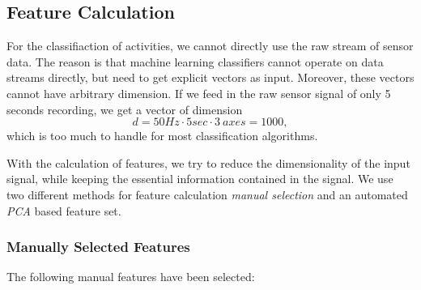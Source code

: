 \subsection{Feature Calculation}
\label{sec:feature_calc}

For the classifiaction of activities, we cannot directly use the raw
stream of sensor data. The reason is that machine learning classifiers
cannot operate on data streams directly, but need to get explicit
vectors as input. Moreover, these vectors cannot have arbitrary
dimension. If we feed in the raw sensor signal of only 5 seconds
recording, we get a vector of dimension
\[ d = 50 Hz \cdot 5 sec \cdot 3\ axes = 1000, \]
which is too much to handle for most classification algorithms.

With the calculation of features, we try to reduce the dimensionality
of the input signal, while keeping the essential information contained
in the signal. We use two different methods for feature calculation
{\it manual selection} and an automated {\it PCA} based feature set.

\subsubsection*{\bf Manually Selected Features}

The following manual features have been selected:

